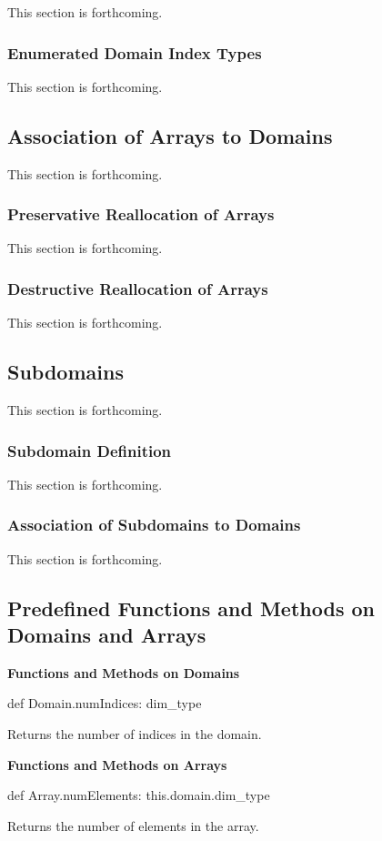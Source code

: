 This section is forthcoming.

\subsubsection{Enumerated Domain Index Types}
\label{Enumerated_Domain_Index_Types}

This section is forthcoming.

\subsection{Association of Arrays to Domains}
\label{Association_of_Arrays_to_Domains}

This section is forthcoming.

\subsubsection{Preservative Reallocation of Arrays}
\label{Preservative_Reallocation_of_Arrays}

This section is forthcoming.

\subsubsection{Destructive Reallocation of Arrays}
\label{Destructive_Reallocation_of_Arrays}

This section is forthcoming.

\subsection{Subdomains}
\label{Subdomains}

This section is forthcoming.

\subsubsection{Subdomain Definition}
\label{Subdomain_Definition}

This section is forthcoming.

\subsubsection{Association of Subdomains to Domains}
\label{Association_of_Subdomains_to_Domains}

This section is forthcoming.

\subsection{Predefined Functions and Methods on Domains and Arrays}

{\bf Functions and Methods on Domains}

\begin{chapel}
def Domain.numIndices: dim_type
\end{chapel}
Returns the number of indices in the domain.

{\bf Functions and Methods on Arrays}

\begin{chapel}
def Array.numElements: this.domain.dim_type
\end{chapel}
Returns the number of elements in the array.
